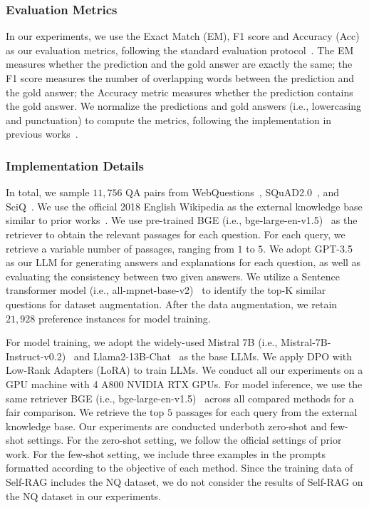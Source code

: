 \subsubsection{\textbf{Evaluation Metrics}}
In our experiments, we use the Exact Match (EM), F1 score and Accuracy (Acc) as our evaluation metrics, following the standard evaluation protocol~\cite{mallen2023trust,jeong2024adaptive,kim2024sure}. 
The EM measures whether the prediction and the gold answer are exactly the same; the F1 score measures the number of overlapping words between the prediction and the gold answer; the Accuracy metric measures whether the prediction contains the gold answer.
We normalize the predictions and gold answers (i.e., lowercasing and punctuation) to compute the metrics, following the implementation in previous works~\cite{rajpurkar-etal-2016-squad,kim2024sure}.


\subsubsection{\textbf{Implementation Details}}
In total, we sample $11,756$ QA pairs from WebQuestions~\cite{berant2013webq}, SQuAD2.0~\cite{rajpurkar2018squad}, and SciQ~\cite{welbl2017sciq}.
We use the official 2018 English Wikipedia as the external knowledge base similar to prior works~\cite{karpukhin-etal-2020-dense,jeong2024adaptive,asai2024selfrag}. 
We use pre-trained BGE (i.e., bge-large-en-v1.5)~\cite{Xiao2024cpack} as the retriever to obtain the relevant passages for each question.
For each query, we retrieve a variable number of passages, ranging from $1$ to $5$.
We adopt GPT-3.5 as our LLM for generating answers and explanations for each question, as well as evaluating the consistency between two given answers.
We utilize a Sentence transformer model (i.e., all-mpnet-base-v2)~\cite{reimers-2020-multilingual-sentence-bert} to identify the top-K similar questions for dataset augmentation.
After the data augmentation, we retain $21,928$ preference instances for model training.


For model training, we adopt the widely-used Mistral 7B (i.e., Mistral-7B-Instruct-v0.2)~\cite{jiang2023mistral7b} and Llama2-13B-Chat~\cite{touvron2023llama2openfoundation} as the base LLMs.
We apply DPO with Low-Rank Adapters (LoRA) \cite{hu2022lora} to train LLMs.
We conduct all our experiments on a GPU machine with 4 A800 NVIDIA RTX GPUs.
For model inference,  we use the same retriever BGE (i.e., bge-large-en-v1.5)~\cite{Xiao2024cpack} across all compared methods for a fair comparison.
We retrieve the top $5$ passages for each query from the external knowledge base.
Our experiments are conducted underboth zero-shot and few-shot settings. For the zero-shot setting, we follow the official settings of prior work\cite{asai2024selfrag,kim2024sure}.
For the few-shot setting, we include three examples in the prompts formatted according to the objective of each method.
Since the training data of Self-RAG includes the NQ dataset, we do not consider the results of Self-RAG on the NQ dataset in our experiments.

